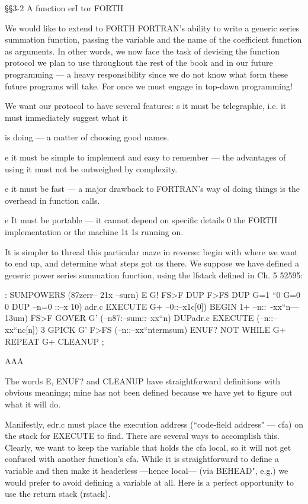 {§§3-2 A function erI tor FORTH

We would like to extend to FORTH FORTRAN’s ability to write
a generic series summation function, passing the variable and the
name of the coefficient function as arguments. In other words, we
now face the task of devising the function protocol we plan to use
throughout the rest of the book and in our future programming
— a heavy responsibility since we do not know what form these
future programs will take. For once we must engage in top-dawn
programming!

We want our protocol to have several features:
s it must be telegraphic, i.e. it must immediately suggest what it

is doing — a matter of choosing good names.

e it must be simple to implement and easy to remember — the
advantages of using it must not be outweighed by complexity.

e it must be fast — a major drawback to FORTRAN's way ol
doing things is the overhead in function calls.

e It must be portable — it cannot depend on specific details 0
the FORTH implementation or the machine 1t 1s running on.

It is simpler to thread this particular maze in reverse: begin with
where we want to end up, and determine what steps got us there.
We suppose we have defined a generic power series summation
function, using the lfstack defined in Ch. 5 52595:

: SUMPOWERS (87zerr-- 21x --surn)
E G! \storeerror
FS>F DUP F>FS \gettypeofx
DUP G=1 \x“0
G=0 0 DUP --n=0 ::--x 10)
adr.c EXECUTE G+ --0::--x1c[0])
BEGIN 1+ --n::~-xx“n—13um)
FS>F GOVER G'
(--n87:--sum::--xx“n)
DUPadr.c EXECUTE
(--n::--xx“nc[n])
3 GPICK G' F>FS
(--n::--xx“ntermsum)
ENUF? NOT WHILE
G+
REPEAT G+ CLEANUP ;

AAA

The words E, ENUF? and CLEANUP have straightforward
definitions with obvious meanings; mine has not been defined
because we have yet to figure out what it will do.

Manifestly, edr.c must place the execution address (“code-field
address" — cfa) on the stack for EXECUTE to find. There are
several ways to accomplish this. Clearly, we want to keep the
variable that holds the cfa local, so it will not get confused with
another function’s cfa. While it is straightforward to define a
variable and then make it headerless —hence local— (via
BEHEAD", e.g.) we would prefer to avoid defining a variable at
all. Here is a perfect opportunity to use the return stack (rstack).

}
